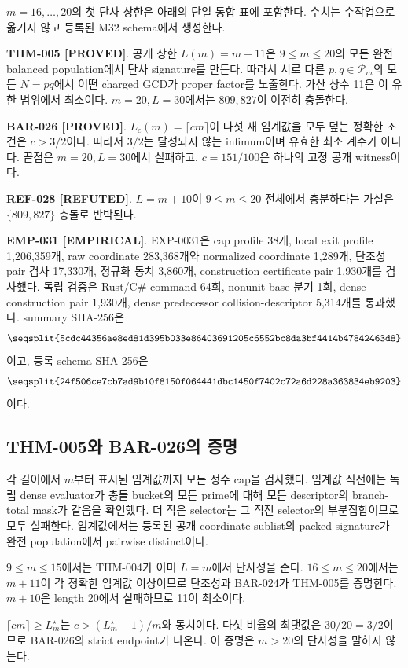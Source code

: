 \documentclass[11pt]{article}
\newcommand{\claimstatus}[2]{\textbf{#1 [#2]}}
\begin{document}
\(m=16,\ldots,20\)의 첫 단사 상한은 아래의 단일 통합 표에
포함한다. 수치는 수작업으로 옮기지 않고 등록된 M32 schema에서
생성한다.

\claimstatus{THM-005}{PROVED}.
공개 상한 \(L(m)=m+11\)은 \(9\le m\le20\)의 모든 완전 balanced
population에서 단사 signature를 만든다. 따라서 서로 다른
\(p,q\in\mathcal P_m\)의 모든 \(N=pq\)에서 어떤 charged GCD가
proper factor를 노출한다. 가산 상수 11은 이 유한 범위에서
최소이다. \(m=20,L=30\)에서는 \(809,827\)이 여전히 충돌한다.

\claimstatus{BAR-026}{PROVED}.
\(L_c(m)=\lceil cm\rceil\)이 다섯 새 임계값을 모두 덮는 정확한
조건은 \(c>3/2\)이다. 따라서 \(3/2\)는 달성되지 않는 infimum이며
유효한 최소 계수가 아니다. 끝점은 \(m=20,L=30\)에서 실패하고,
\(c=151/100\)은 하나의 고정 공개 witness이다.

\claimstatus{REF-028}{REFUTED}.
\(L=m+10\)이 \(9\le m\le20\) 전체에서 충분하다는 가설은
\(\{809,827\}\) 충돌로 반박된다.

\claimstatus{EMP-031}{EMPIRICAL}.
EXP-0031은 cap profile 38개, local exit profile 1,206,359개,
raw coordinate 283,368개와 normalized coordinate 1,289개,
단조성 pair 검사 17,330개, 정규화 동치 3,860개, construction
certificate pair 1,930개를 검사했다. 독립 검증은 Rust/C\# command
64회, nonunit-base 분기 1회, dense construction pair 1,930개,
dense predecessor collision-descriptor 5,314개를 통과했다.
summary SHA-256은
\[
\texttt{\seqsplit{5cdc44356ae8ed81d395b033e86403691205c6552bc8da3bf4414b47842463d8}}
\]
이고, 등록 schema SHA-256은
\[
\texttt{\seqsplit{24f506ce7cb7ad9b10f8150f064441dbc1450f7402c72a6d228a363834eb9203}}
\]
이다.

\subsection{THM-005와 BAR-026의 증명}

각 길이에서 \(m\)부터 표시된 임계값까지 모든 정수 cap을 검사했다.
임계값 직전에는 독립 dense evaluator가 충돌 bucket의 모든 prime에
대해 모든 descriptor의 branch-total mask가 같음을 확인했다. 더
작은 selector는 그 직전 selector의 부분집합이므로 모두 실패한다.
임계값에서는 등록된 공개 coordinate sublist의 packed signature가
완전 population에서 pairwise distinct이다.

\(9\le m\le15\)에서는 THM-004가 이미 \(L=m\)에서 단사성을 준다.
\(16\le m\le20\)에서는 \(m+11\)이 각 정확한 임계값 이상이므로
단조성과 BAR-024가 THM-005를 증명한다. \(m+10\)은 length 20에서
실패하므로 11이 최소이다.

\(\lceil cm\rceil\ge L_m^\star\)는
\(c>(L_m^\star-1)/m\)와 동치이다. 다섯 비율의 최댓값은
\(30/20=3/2\)이므로 BAR-026의 strict endpoint가 나온다. 이 증명은
\(m>20\)의 단사성을 말하지 않는다.
\end{document}
